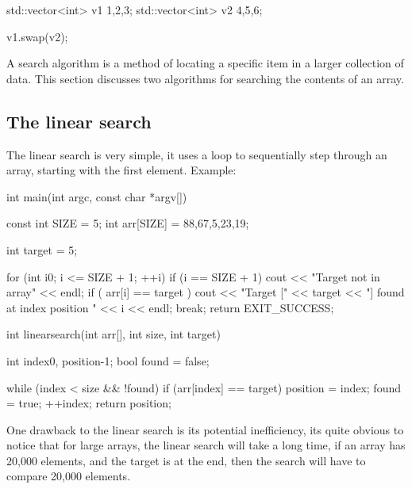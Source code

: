 \documentclass{report}
\begin{document}
    \begin{cppcode}
std::vector<int> v1 {1,2,3};
std::vector<int> v2 {4,5,6};

v1.swap(v2);
    \end{cppcode}
    

    \pagebreak
    \bigbreak \noindent 
    \begin{concept}
 A search algorithm is a method of locating a specific item in a larger collection of data. This section discusses two algorithms for searching the contents of an array.
	\end{concept}
    \bigbreak \noindent 
    \subsection{The linear search}
    \bigbreak \noindent 
    The linear search is very simple, it uses a loop to sequentially step through an array, starting with the first element.
    \bigbreak \noindent 
    Example:
    \bigbreak \noindent 
    
    \begin{cppcode}
int main(int argc, const char *argv[]) {

    const int SIZE = 5;
    int arr[SIZE] = {88,67,5,23,19};

    int target = 5;

    for (int i{0}; i <= SIZE + 1; ++i) {
        if (i == SIZE + 1) {
            cout << "Target not in array" << endl;
        }
        if ( arr[i] == target ) {
            cout << "Target [" << target << "] found at index position " << i << endl;
            break;
        }
    }
    return EXIT_SUCCESS;
}
    \end{cppcode}
    
    \bigbreak \noindent 
    
    \begin{cppcode}
int linearsearch(int arr[], int size, int target) {
    int index{0}, position{-1};
    bool found = false;

    while (index < size && !found) {
        if (arr[index] == target) {
            position = index;
            found = true;
        }
        ++index;
    }
    return position;
}
    \end{cppcode}
    
    \bigbreak \noindent 
    \pagebreak
    One drawback to the linear search is its potential inefficiency, its quite obvious to notice that for large arrays, the linear search will take a long time, if an array has 20,000 elements, and the target is at the end, then the search will have to compare 20,000 elements.
    \bigbreak \noindent 
\end{document}
